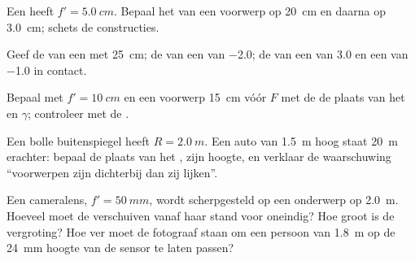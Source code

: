 \begin{exercise}[$\star$]\label{exo:b1:mirrors-thin-lenses:2}
Een  heeft $f' = \qty{5.0}{cm}$. Bepaal het  van een
voorwerp op \qty{20}{cm} en daarna op \qty{3.0}{cm}; schets de constructies.
\end{exercise}

\begin{exercise}[$\star$]\label{exo:b1:mirrors-thin-lenses:3}
Geef de  van een  met  \qty{25}{cm}; de
 van een  van \qty{-2.0}{\delta}; de 
van een  van \qty{+3.0}{\delta} en een van \qty{-1.0}{\delta} in contact.
\end{exercise}

\begin{exercise}[$\star$]\label{exo:b1:mirrors-thin-lenses:4}
Bepaal met $f' = \qty{10}{cm}$ en een voorwerp \qty{15}{cm} vóór $F$ met de
 de plaats van het  en $\gamma$; controleer met de
.
\end{exercise}

\begin{exercise}[$\star\star$]\label{exo:b1:mirrors-thin-lenses:5}
Een bolle buitenspiegel heeft $R = \qty{2.0}{m}$. Een auto van \qty{1.5}{m}
hoog staat \qty{20}{m} erachter: bepaal de plaats van het , zijn hoogte, en
verklaar de waarschuwing ``voorwerpen zijn dichterbij dan zij lijken''.
\end{exercise}

\begin{exercise}[$\star\star$]\label{exo:b1:mirrors-thin-lenses:6}
Een cameralens, $f' = \qty{50}{mm}$, wordt scherpgesteld op een onderwerp op
\qty{2.0}{m}. Hoeveel moet de  verschuiven vanaf haar stand voor oneindig?
Hoe groot is de vergroting? Hoe ver moet de fotograaf staan om een persoon van
\qty{1.8}{m} op de \qty{24}{mm} hoogte van de sensor te laten passen?
\end{exercise}

